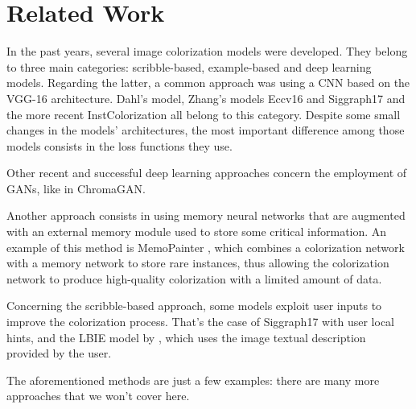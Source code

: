 \section{Related Work}
In the past years, several image colorization models were developed. They belong to three main categories:
scribble-based, example-based and deep learning models. Regarding the latter, a common approach was using
a CNN based on the VGG-16 architecture. Dahl's model, Zhang's models Eccv16 \cite{zhang} and Siggraph17 and the more recent InstColorization \cite{su} all belong to this category. Despite some
small changes in the models' architectures, the most important difference among those models consists in the loss
functions they use.

Other recent and successful deep learning approaches concern the employment of GANs, like in
ChromaGAN.
 
Another approach consists in using memory neural networks that are augmented with an external
memory module used to store some critical information. An example of this method is MemoPainter \cite{animation},
which combines a colorization network with a memory network to store rare instances, thus allowing the
colorization network to produce high-quality colorization with a limited amount of data.

Concerning the scribble-based approach, some models exploit user inputs to improve the colorization process.
That's the case of Siggraph17 with user local hints, and the LBIE model by \cite{language}, which
uses the image textual description provided by the user.

The aforementioned methods are just a few examples: there are many more approaches that we won't cover here.
